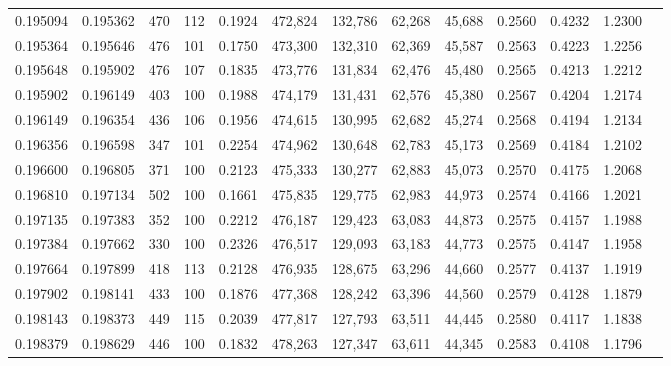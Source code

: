 \begin{tabular}{rrrrrrrrrrrrr}
0.195094 & 0.195362 &   470 & 112 &                                     0.1924 & 472,824 & 132,786 &  62,268 &  45,688 & 0.2560 & 0.4232 & 1.2300 \\
0.195364 & 0.195646 &   476 & 101 &                                     0.1750 & 473,300 & 132,310 &  62,369 &  45,587 & 0.2563 & 0.4223 & 1.2256 \\
0.195648 & 0.195902 &   476 & 107 &                                     0.1835 & 473,776 & 131,834 &  62,476 &  45,480 & 0.2565 & 0.4213 & 1.2212 \\
0.195902 & 0.196149 &   403 & 100 &                                     0.1988 & 474,179 & 131,431 &  62,576 &  45,380 & 0.2567 & 0.4204 & 1.2174 \\
0.196149 & 0.196354 &   436 & 106 &                                     0.1956 & 474,615 & 130,995 &  62,682 &  45,274 & 0.2568 & 0.4194 & 1.2134 \\
0.196356 & 0.196598 &   347 & 101 &                                     0.2254 & 474,962 & 130,648 &  62,783 &  45,173 & 0.2569 & 0.4184 & 1.2102 \\
0.196600 & 0.196805 &   371 & 100 &                                     0.2123 & 475,333 & 130,277 &  62,883 &  45,073 & 0.2570 & 0.4175 & 1.2068 \\
0.196810 & 0.197134 &   502 & 100 &                                     0.1661 & 475,835 & 129,775 &  62,983 &  44,973 & 0.2574 & 0.4166 & 1.2021 \\
0.197135 & 0.197383 &   352 & 100 &                                     0.2212 & 476,187 & 129,423 &  63,083 &  44,873 & 0.2575 & 0.4157 & 1.1988 \\
0.197384 & 0.197662 &   330 & 100 &                                     0.2326 & 476,517 & 129,093 &  63,183 &  44,773 & 0.2575 & 0.4147 & 1.1958 \\
0.197664 & 0.197899 &   418 & 113 &                                     0.2128 & 476,935 & 128,675 &  63,296 &  44,660 & 0.2577 & 0.4137 & 1.1919 \\
0.197902 & 0.198141 &   433 & 100 &                                     0.1876 & 477,368 & 128,242 &  63,396 &  44,560 & 0.2579 & 0.4128 & 1.1879 \\
0.198143 & 0.198373 &   449 & 115 &                                     0.2039 & 477,817 & 127,793 &  63,511 &  44,445 & 0.2580 & 0.4117 & 1.1838 \\
0.198379 & 0.198629 &   446 & 100 &                                     0.1832 & 478,263 & 127,347 &  63,611 &  44,345 & 0.2583 & 0.4108 & 1.1796 \\

\end{tabular}
